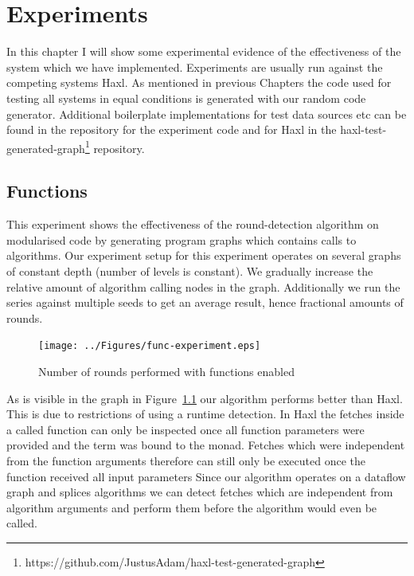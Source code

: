 \chapter{Experiments}

\label{ch:Experiments}

In this chapter I will show some experimental evidence of the effectiveness of the system which we have implemented.
Experiments are usually run against the competing systems Haxl\cite{Haxl:library:link}.
As mentioned in previous Chapters the code used for testing all systems in equal conditions is generated with our random code generator\cite{Goens-rand-code-graph}.
Additional boilerplate implementations for test data sources etc can be found in the \yauhau{} repository\cite{Yauhau:repository:link} for the \yauhau{} experiment code and for Haxl in the haxl-test-generated-graph\footnote{https://github.com/JustusAdam/haxl-test-generated-graph} repository.

\section{Functions}

This experiment shows the effectiveness of the round-detection algorithm on modularised code by generating program graphs which contains calls to algorithms.
Our experiment setup for this experiment operates on several graphs of constant depth (number of levels is constant).
We gradually increase the relative amount of algorithm calling nodes in the graph.
Additionally we run the series against multiple seeds to get an average result, hence fractional amounts of rounds.

\begin{figure}
    \texttt{[image: ../Figures/func-experiment.eps]}
    \caption{Number of rounds performed with functions enabled}
    \label{fig:experiment-functions}
\end{figure}

As is visible in the graph in Figure~\ref{fig:experiment-functions} our algorithm performs better than Haxl.
This is due to restrictions of using a runtime detection.
In Haxl the fetches inside a called function can only be inspected once all function parameters were provided and the term was bound to the monad.
Fetches which were independent from the function arguments therefore can still only be executed once the function received all input parameters
Since our algorithm operates on a dataflow graph and splices algorithms we can detect fetches which are independent from algorithm arguments and perform them before the algorithm would even be called.

